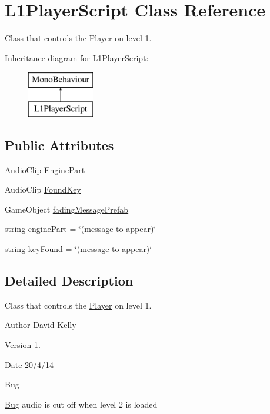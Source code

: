 \hypertarget{class_l1_player_script}{\section{L1\-Player\-Script Class Reference}
\label{class_l1_player_script}
}


Class that controls the \hyperlink{class_player}{Player} on level 1.  


Inheritance diagram for L1\-Player\-Script\-:\begin{figure}[H]
\begin{center}
\leavevmode
\includegraphics[height=2.000000cm]{class_l1_player_script}
\end{center}
\end{figure}
\subsection*{Public Attributes}
\begin{DoxyCompactItemize}
\item 
Audio\-Clip \hyperlink{class_l1_player_script_a8de3ae6c3ec4bc6e6df11cb70ce2a23a}{Engine\-Part}
\item 
Audio\-Clip \hyperlink{class_l1_player_script_a16ab44f36ede46fcee2935528bf69fde}{Found\-Key}
\item 
Game\-Object \hyperlink{class_l1_player_script_abe4e76e0f60f25ca1301c7bf73b10afe}{fading\-Message\-Prefab}
\item 
string \hyperlink{class_l1_player_script_afbc69f415412daadff795372b4336ab9}{engine\-Part} = \char`\"{}(message to appear)\char`\"{}
\item 
string \hyperlink{class_l1_player_script_ac3f3f18561f2bea066a3b06f84e993ea}{key\-Found} = \char`\"{}(message to appear)\char`\"{}
\end{DoxyCompactItemize}


\subsection{Detailed Description}
Class that controls the \hyperlink{class_player}{Player} on level 1. 

\begin{DoxyAuthor}{Author}
David Kelly 
\end{DoxyAuthor}
\begin{DoxyVersion}{Version}
1. 
\end{DoxyVersion}
\begin{DoxyDate}{Date}
20/4/14
\end{DoxyDate}
\begin{DoxyRefDesc}{Bug}
\item[\hyperlink{bug__bug000002}{Bug}]audio is cut off when level 2 is loaded \end{DoxyRefDesc}


